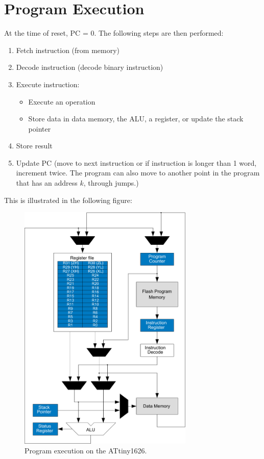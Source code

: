 \documentclass[a4paper]{report}
\begin{document}
\section{Program Execution}
At the time of reset, PC = 0. The following steps are then performed:
\begin{enumerate}
    \item Fetch instruction (from memory)
    \item Decode instruction (decode binary instruction)
    \item Execute instruction:
          \begin{itemize}
              \item Execute an operation
              \item Store data in data memory, the ALU, a register, or update the stack pointer
          \end{itemize}
    \item Store result
    \item Update PC (move to next instruction or if instruction is longer than 1 word, increment twice. The program can also move to another point in the program that has an address \(k\), through jumps.)
\end{enumerate}
This is illustrated in the following figure:
\begin{figure}[H]
    \centering
    \includegraphics[height = 12cm, keepaspectratio = true]{figures/AVR_CPU.pdf}
    \caption{Program execution on the ATtiny1626.} %
\end{figure}
\end{document}
